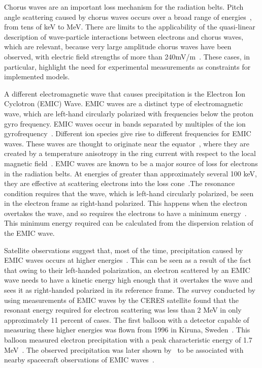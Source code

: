 Chorus waves are an important loss mechanism for the radiation belts. Pitch angle scattering caused by chorus waves occurs over a broad range of energies~\citet{thorne2010}, from tens of keV to MeV. There are limits to the applicability of the quasi-linear description of wave-particle interactions between electrons and chorus waves, which are relevant, because very large amplitude chorus waves have been observed, with electric field strengths of more than 240mV/m~\citep{cattell2008,thorne2010}. These cases, in particular, highlight the need for experimental measurements as constraints for implemented models. 

A different electromagnetic wave that causes precipitation is the Electron Ion Cyclotron (EMIC) Wave. EMIC waves are a distinct type of electromagnetic wave, which are left-hand circularly polarized with frequencies below the proton gyro frequency. EMIC waves occur in bands separated by multiples of the ion gyrofrequency~\citep{thorne2010}. Different ion species give rise to different frequencies for EMIC waves. These waves are thought to originate near the equator~\citep{fraser1996,lotouaniu2005,millan2007}, where they are created by a temperature anisotropy in the ring current with respect to the local magnetic field~\citep{jordanova2001}. EMIC waves are known to be a major source of loss for electrons in the radiation belts. At energies of greater than approximately several 100 keV, they are effective at scattering electrons into the loss cone~\citet{thorne1981,millan2007}.The resonance condition requires that the wave, which is left-hand circularly polarized, be seen in the electron frame as right-hand polarized. This happens when the electron overtakes the wave, and so requires the electrons to have a  minimum energy~\citet{millan2007}. This minimum energy required can be calculated from the dispersion relation of the EMIC wave.

Satellite observations suggest that, most of the time, precipitation caused by EMIC waves occurs at higher energies~\citep{millan2007}. This can be seen as a result of the fact that owing to their left-handed polarization, an electron scattered by an EMIC wave needs to have a kinetic energy high enough that it overtakes the wave and sees it as right-handed polarized in its reference frame. The survey conducted by~\citep{merideth2003} using measurements of EMIC waves by the CERES satellite found that the resonant energy required for electron scattering was less than 2 MeV in only approximately 11 percent of cases. The first balloon with a detector capable of measuring these higher energies was flown from 1996 in Kiruna, Sweden~\citep{millan2007}. This balloon measured electron precipitation with a peak characteristic energy of 1.7 MeV~\citep{foat1998}. The observed precipitation was later shown by~\citep{lorentzen2000} to be associated with nearby spacecraft observations of EMIC waves~\citet{millan2007}.

